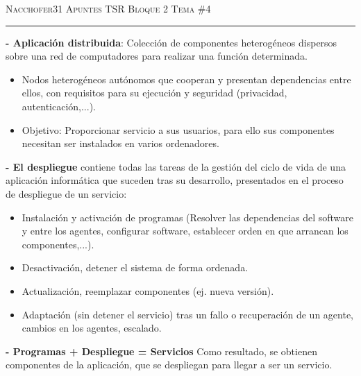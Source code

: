 \documentclass[12pt]{amsart}
\begin{document}
    
    \thispagestyle{empty}
    
    {\scshape Nacchofer31} \hfill {\scshape \large Apuntes TSR Bloque 2} \hfill {\scshape Tema \#4}
     
    \hrule
    
    \medskip
    
    \textbf{- Aplicación distribuida}: Colección de 
    componentes heterogéneos dispersos sobre una red de 
    computadores para realizar una función determinada.
    
    
    \begin{itemize}
    
    \item  Nodos heterogéneos autónomos que cooperan y presentan dependencias entre ellos, con requisitos para su ejecución y seguridad (privacidad, autenticación,...).
    
    \item  Objetivo: Proporcionar servicio a sus usuarios, para ello sus componentes necesitan ser instalados en varios ordenadores.
    
    \end{itemize}
    
    \textbf{- El despliegue} contiene todas las tareas de la gestión del ciclo de vida de una aplicación 
    informática que suceden tras su desarrollo, presentados en el proceso de despliegue de un servicio:
       
    
    \begin{itemize}
    
    \item  Instalación y activación de programas (Resolver 
    las dependencias del 
    software y entre los agentes, configurar software, establecer orden en que arrancan los componentes,...).
    
    \item  Desactivación, detener el sistema de forma ordenada.
    
    \item  Actualización, reemplazar componentes (ej. nueva versión). 
    
    \item  Adaptación (sin detener el servicio) tras un fallo o recuperación de un agente, cambios en los agentes, escalado.
    
    \end{itemize}
    
    \textbf{- Programas + Despliegue = Servicios} Como resultado, se obtienen componentes de la 
    aplicación, que se despliegan para llegar a ser un servicio.
    
\end{document}
